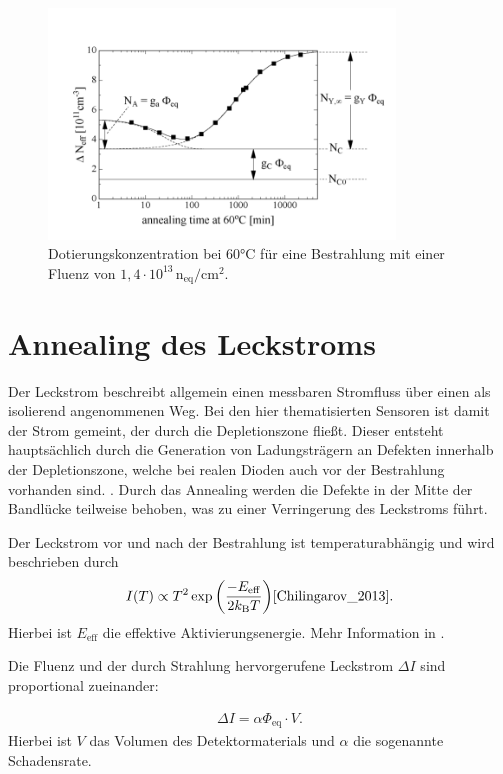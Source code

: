 \begin{figure}
  \centering
  \includegraphics[width=0.82\textwidth]{logos/n_eff_beispiel.PNG}
  \caption{Dotierungskonzentration bei 60°C für eine Bestrahlung mit einer Fluenz von
  $1,4\cdot 10^{13} \, \mathrm{n_{eq}/cm^2}$.\cite{moll}}
  \label{fig:n_eff_beispiel}
\end{figure}



\section{Annealing des Leckstroms}
Der Leckstrom beschreibt allgemein einen messbaren Stromfluss über einen als isolierend
angenommenen Weg. Bei den hier thematisierten Sensoren ist damit der Strom gemeint, der durch die
Depletionszone fließt. Dieser entsteht hauptsächlich durch die Generation von Ladungsträgern an Defekten
innerhalb der Depletionszone, welche
bei realen Dioden auch vor der Bestrahlung vorhanden sind. \cite{moll}.
Durch das Annealing werden die Defekte in der Mitte der Bandlücke teilweise behoben,
was zu einer Verringerung des Leckstroms führt.

Der Leckstrom vor und nach der Bestrahlung ist temperaturabhängig und wird
beschrieben durch
\begin{align}
  I(T) \propto T^2 \exp{\left(\frac{-E_{\mathrm{eff}}}{2 k_{\mathrm{B}}T}\right)} \text{\cite{Chilingarov_2013}} \label{eqn:Chilingarov_2013}.
\end{align}
Hierbei ist $E_{\mathrm{eff}}$ die  effektive Aktivierungsenergie. Mehr Information in \cite{Chilingarov_2013}.

Die Fluenz und der durch Strahlung hervorgerufene Leckstrom $\Delta I$ sind
proportional zueinander:


\begin{align}
  \Delta I = \alpha \Phi_{\mathrm{eq}} \cdot V .
\end{align}
Hierbei ist $V$ das Volumen des Detektormaterials und $\alpha$ die
sogenannte Schadensrate.



